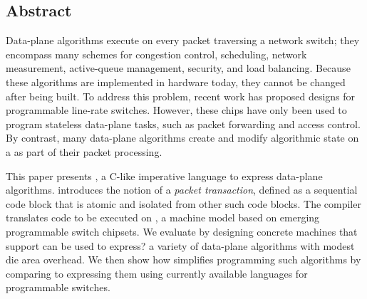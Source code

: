 \subsection*{Abstract}
Data-plane algorithms execute on every packet traversing a network switch; they
encompass many schemes for congestion control, scheduling, network measurement,
active-queue management, security, and load balancing. Because these algorithms
are implemented in hardware today, they cannot be changed after being built. To
address this problem, recent work has proposed designs for programmable
line-rate switches.  However, these chips have only been used to program
stateless data-plane tasks, such as packet forwarding and access control. By
contrast, many data-plane algorithms create and modify algorithmic state on a
as part of their packet processing.

This paper presents \pktlanguage, a C-like imperative language to express
data-plane algorithms. \pktlanguage introduces the notion of a {\em packet
transaction}, defined as a sequential code block that is atomic and isolated
from other such code blocks.  The \pktlanguage compiler translates \pktlanguage
code to be executed on \absmachine, a machine model based on emerging programmable switch
chipsets. We evaluate \pktlanguage by designing concrete \absmachine
machines that support \ac{can be used to express?} 
a variety of data-plane algorithms with modest die area
overhead. We then show how \pktlanguage simplifies programming such algorithms by 
comparing to expressing them using currently available languages for programmable switches.
